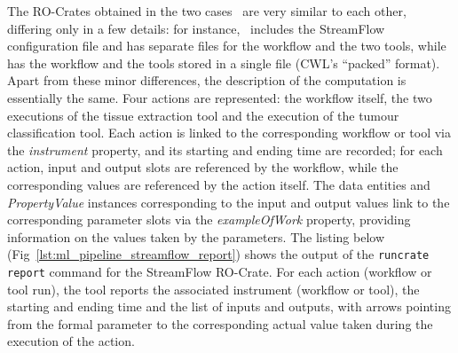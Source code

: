 \documentclass[10pt,letterpaper]{article}
\begin{document}
The RO-Crates obtained in the two cases~\cite{Colonnelli 2023, run-pathology}
are very similar to each other, differing only in a few details: for instance,~\cite{Colonnelli 2023} includes the StreamFlow configuration file and has separate files for the workflow and the two tools, while
\cite{run-pathology} has the workflow and the tools stored in a single file (CWL's ``packed'' format).
Apart from these minor differences, the description of the computation is essentially the same.
Four actions are represented: the workflow itself, the two executions of the tissue extraction tool and the execution of the tumour classification tool.
Each action is linked to the corresponding workflow or tool via the
\emph{instrument} property, and its starting and ending time are recorded; for each action, input and output slots are referenced by the workflow, while the corresponding values are referenced by the action itself.
The data entities and \emph{PropertyValue} instances corresponding to the input and output values link to the corresponding parameter slots via the \emph{exampleOfWork} property, providing information on the values taken by the parameters.
The listing below (Fig~\ref{lst:ml_pipeline_streamflow_report}) shows the output of the
\texttt{runcrate report} command for the StreamFlow RO-Crate. 
For each action (workflow or tool run), the tool reports the associated instrument (workflow or tool), the starting and ending time and the list of inputs and outputs, with arrows pointing from the formal parameter to the corresponding actual value taken during the execution of the action.
\end{document}

